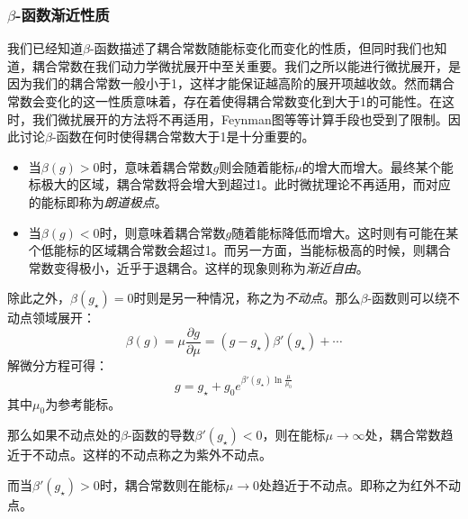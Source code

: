 \subsubsection*{$\beta$-函数渐近性质}
我们已经知道$\beta$-函数描述了耦合常数随能标变化而变化的性质，但同时我们也知道，耦合常数在我们动力学微扰展开中至关重要。我们之所以能进行微扰展开，是因为我们的耦合常数一般小于1，这样才能保证越高阶的展开项越收敛。然而耦合常数会变化的这一性质意味着，存在着使得耦合常数变化到大于1的可能性。在这时，我们微扰展开的方法将不再适用，Feynman图等等计算手段也受到了限制。因此讨论$\beta$-函数在何时使得耦合常数大于1是十分重要的。
\begin{itemize}
	\item 当$\beta(g)>0$时，意味着耦合常数$g$则会随着能标$\mu$的增大而增大。最终某个能标极大的区域，耦合常数将会增大到超过1。此时微扰理论不再适用，而对应的能标即称为\emph{朗道极点}。
	\item 当$\beta(g)<0$时，则意味着耦合常数$g$随着能标降低而增大。这时则有可能在某个低能标的区域耦合常数会超过1。而另一方面，当能标极高的时候，则耦合常数变得极小，近乎于退耦合。这样的现象则称为\emph{渐近自由}。
\end{itemize}

除此之外，$\beta(g_{\star})=0$时则是另一种情况，称之为\emph{不动点}。那么$\beta$-函数则可以绕不动点领域展开：
\begin{equation}
\beta(g)=\mu\frac{\partial g}{\partial\mu}=(g-g_{\star})\beta'(g_{\star})+\cdots
\end{equation}
解微分方程可得：
\begin{equation}
g=g_{\star}+g_0e^{\beta'(g_{\star})\ln\frac{\mu}{\mu_0}}
\end{equation}
其中$\mu_0$为参考能标。

那么如果不动点处的$\beta$-函数的导数$\beta'(g_\star)<0$，则在能标$\mu\rightarrow\infty$处，耦合常数趋近于不动点。这样的不动点称之为紫外不动点。

而当$\beta'(g_\star)>0$时，耦合常数则在能标$\mu\rightarrow0$处趋近于不动点。即称之为红外不动点。
